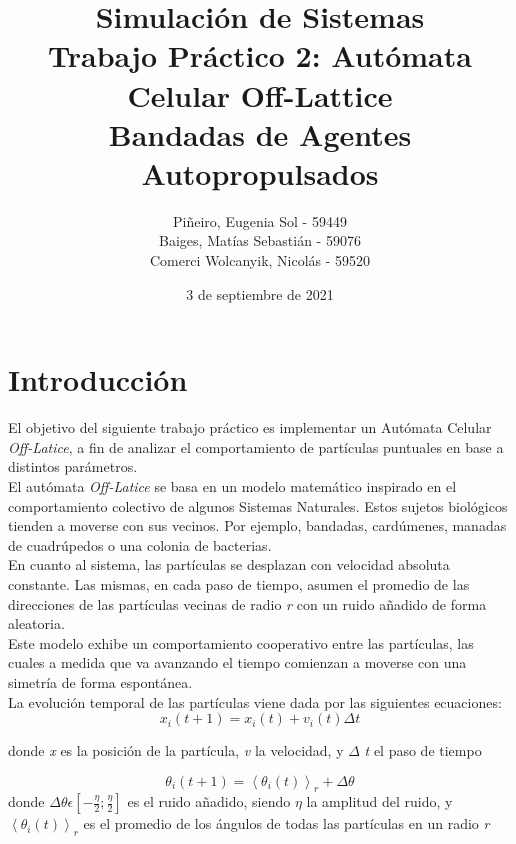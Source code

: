 \documentclass[12pt, a4paper]{report}
\title{%
Simulación de Sistemas\\
Trabajo Práctico 2: Autómata Celular Off-Lattice \\
\large Bandadas de Agentes Autopropulsados
}
\author{Piñeiro, Eugenia Sol - 59449\\
Baiges, Matías Sebastián - 59076\\
Comerci Wolcanyik, Nicolás - 59520
}
\date{3 de septiembre de 2021}
\begin{document}
\maketitle

\tableofcontents
\newpage

\section{Introducción}
El objetivo del siguiente trabajo práctico es implementar un Autómata Celular \emph{Off-Latice}, 
a fin de analizar el comportamiento de partículas puntuales en base a distintos parámetros.\\

El autómata \emph{Off-Latice} se basa en un modelo matemático inspirado en el comportamiento colectivo de algunos Sistemas Naturales. Estos sujetos biológicos tienden a moverse con sus vecinos. Por ejemplo, bandadas, cardúmenes, manadas de cuadrúpedos o una colonia de bacterias.\\

En cuanto al sistema, las partículas se desplazan con velocidad absoluta constante. Las mismas, en cada paso de tiempo, asumen el promedio de las direcciones de las partículas vecinas de radio \emph{r} con un ruido añadido de forma aleatoria.\\

Este modelo exhibe un comportamiento cooperativo entre las partículas, las cuales a medida que va avanzando el tiempo comienzan a moverse con una simetría de forma espontánea.\\ 

La evolución temporal de las partículas viene dada por las siguientes ecuaciones: 
\begin{equation}
\label{eq:velocity}
x_i(t+1) = x_i(t) + v_i(t) \Delta t 
\end{equation}

donde \emph{x} es la posición de la partícula, \emph{v} la velocidad, y $\Delta$ \emph{t} el paso de tiempo  

\begin{equation}
\label{eq:angle}
\theta _i(t+1) = \left\langle \theta _i(t)\right\rangle _r + \Delta \theta 
\end{equation}
donde $\Delta \theta  \epsilon  [-\frac{\eta}{2}; \frac{\eta}{2}]$ es el ruido añadido, siendo $\eta$ la amplitud del ruido, y \emph{$\left\langle \theta _i(t)\right\rangle _r$} es el promedio de los ángulos de todas las partículas en un radio \emph{r}
\end{document}
